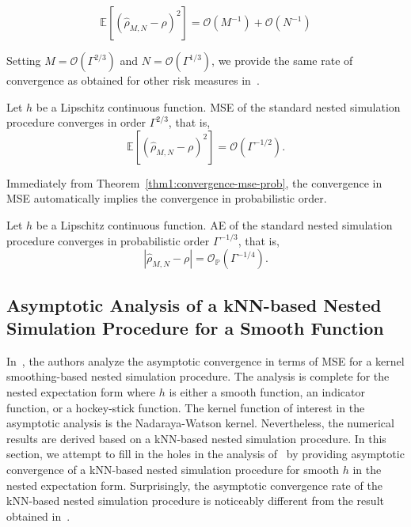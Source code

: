 \begin{equation}
    \mathbb{E} \left[ \left( \hat{\rho}_{M, N} - \rho \right)^2 \right] = \mathcal{O}(M^{-1}) + \mathcal{O}(N^{-1})
\end{equation}

Setting $M = \mathcal{O}(\Gamma^{2/3})$ and $N = \mathcal{O}(\Gamma^{1/3})$, we provide the same rate of convergence as obtained for other risk measures in~\cite{gordy2010nested}.

\begin{theorem}
    Let $h$ be a Lipschitz continuous function. 
    MSE of the standard nested simulation procedure converges in order $\Gamma^{2/3}$, that is,
    $$\mathbb{E} \left[ \left( \hat{\rho}_{M, N} - \rho \right)^2 \right] = \mathcal{O}(\Gamma^{-1/2}).$$
\end{theorem}

Immediately from Theorem~\ref{thm1:convergence-mse-prob}, the convergence in MSE automatically implies the convergence in probabilistic order.

\begin{corollary}
    Let $h$ be a Lipschitz continuous function. AE of the standard nested simulation procedure converges in probabilistic order $\Gamma^{-1/3}$, that is,
    $$\left| \hat{\rho}_{M, N} - \rho \right| = \mathcal{O}_\mathbb{P}(\Gamma^{-1/4}).$$
\end{corollary}

\subsection{Asymptotic Analysis of a kNN-based Nested Simulation Procedure for a Smooth Function}

In~\cite{hong2017kernel}, the authors analyze the asymptotic convergence in terms of MSE for a kernel smoothing-based nested simulation procedure.
The analysis is complete for the nested expectation form where $h$ is either a smooth function, an indicator function, or a hockey-stick function.
The kernel function of interest in the asymptotic analysis is the Nadaraya-Watson kernel.
Nevertheless, the numerical results are derived based on a kNN-based nested simulation procedure.
In this section, we attempt to fill in the holes in the analysis of~\cite{hong2017kernel} by providing asymptotic convergence of a kNN-based nested simulation procedure for smooth $h$ in the nested expectation form.
Surprisingly, the asymptotic convergence rate of the kNN-based nested simulation procedure is noticeably different from the result obtained in~\cite{hong2017kernel}.

